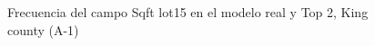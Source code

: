 \begin{figure}[H]
    \centering
    
    \caption{Frecuencia del campo Sqft lot15 en el modelo real y Top 2, King county (A-1)}
    \label{frecuency-top2-sqft lot15}
\end{figure}